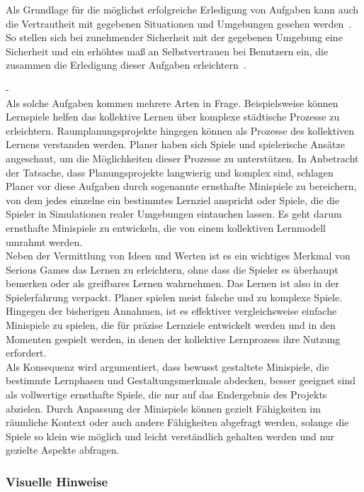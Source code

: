 
Als Grundlage für die möglichst erfolgreiche Erledigung von Aufgaben kann auch die Vertrautheit mit gegebenen Situationen und Umgebungen gesehen werden~\cite{scott1966activation}. So stellen sich bei zunehmender Sicherheit mit der gegebenen Umgebung eine Sicherheit und ein erhöhtes maß an Selbstvertrauen bei Benutzern ein, die zusammen die Erledigung dieser Aufgaben erleichtern~\cite{scott1966activation}. 

-\cite{devisch2018mini}\\
Als solche Aufgaben kommen mehrere Arten in Frage. Beispielsweise können Lernspiele helfen das kollektive Lernen über komplexe städtische Prozesse zu erleichtern. Raumplanungsprojekte hingegen können als Prozesse des kollektiven Lernens verstanden werden. Planer haben sich Spiele und spielerische Ansätze angeschaut, um die Möglichkeiten dieser Prozesse zu unterstützen. In Anbetracht der Tatsache, dass Planungsprojekte langwierig  und komplex sind, schlagen Planer vor diese Aufgaben durch sogenannte ernsthafte Minispiele zu bereichern, von dem jedes einzelne ein bestimmtes Lernziel anspricht oder Spiele, die die Spieler in Simulationen realer Umgebungen eintauchen lassen. Es geht darum ernsthafte Minispiele zu entwickeln, die von einem kollektiven Lernmodell umrahmt werden.\\ 
Neben der Vermittlung von Ideen und Werten ist es ein wichtiges Merkmal von Serious Games das Lernen zu erleichtern, ohne dass die Spieler es überhaupt bemerken oder als greifbares Lernen wahrnehmen. Das Lernen ist also in der Spielerfahrung verpackt. Planer spielen meist falsche und zu komplexe Spiele. Hingegen der bisherigen Annahmen, ist es effektiver vergleichsweise einfache Minispiele zu spielen, die für präzise Lernziele entwickelt werden und in den Momenten gespielt werden, in denen der kollektive Lernprozess ihre Nutzung erfordert.\\
Als Konsequenz wird argumentiert, dass bewusst gestaltete Minispiele, die bestimmte Lernphasen und Gestaltungsmerkmale abdecken, besser geeignet sind als vollwertige ernsthafte Spiele, die nur auf das Endergebnis des Projekts abzielen. Durch Anpassung der Minispiele können gezielt Fähigkeiten im räumliche Kontext oder auch andere Fähigkeiten abgefragt werden, solange die Spiele so klein wie möglich und leicht verständlich gehalten werden und nur gezielte Aspekte abfragen.

\subsubsection{Visuelle Hinweise}

